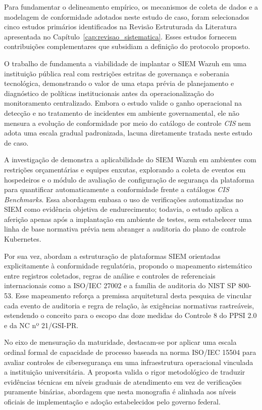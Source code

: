 Para fundamentar o delineamento empírico, os mecanismos de coleta de dados e a modelagem de conformidade adotados neste estudo de caso, foram selecionados cinco estudos primários identificados na Revisão Estruturada da Literatura apresentada no Capítulo~\ref{cap:revisao_sistematica}. Esses estudos fornecem contribuições complementares que subsidiam a definição do protocolo proposto.


O trabalho de  fundamenta a viabilidade de implantar o SIEM Wazuh em uma instituição pública real com restrições estritas de governança e soberania tecnológica, demonstrando o valor de uma etapa prévia de planejamento e diagnóstico de políticas institucionais antes da operacionalização do monitoramento centralizado. Embora o estudo valide o ganho operacional na detecção e no tratamento de incidentes em ambiente governamental, ele não mensura a evolução de conformidade por meio do catálogo de controle \textit{CIS} nem adota uma escala gradual padronizada, lacuna diretamente tratada neste estudo de caso.

A investigação de  demonstra a aplicabilidade do SIEM Wazuh em ambientes com restrições orçamentárias e equipes enxutas, explorando a coleta de eventos em hospedeiros e o módulo de avaliação de configuração de segurança da plataforma para quantificar automaticamente a conformidade frente a catálogos \textit{CIS Benchmarks}. Essa abordagem embasa o uso de verificações automatizadas no SIEM como evidência objetiva de endurecimento; todavia, o estudo aplica a aferição apenas após a implantação em ambiente de testes, sem estabelecer uma linha de base normativa prévia nem abranger a auditoria do plano de controle Kubernetes.

Por sua vez,  abordam a estruturação de plataformas SIEM orientadas explicitamente à conformidade regulatória, propondo o mapeamento sistemático entre registros coletados, regras de análise e controles de referenciais internacionais como a ISO/IEC 27002 e a família de auditoria do NIST SP 800-53. Esse mapeamento reforça a premissa arquitetural desta pesquisa de vincular cada evento de auditoria e regra de relação, às exigências normativas rastreáveis, estendendo o conceito para o escopo das doze medidas do Controle 8 do PPSI 2.0 e da NC nº 21/GSI-PR.

No eixo de mensuração da maturidade,  destacam-se por aplicar uma escala ordinal formal de capacidade de processo baseada na norma ISO/IEC 15504 para avaliar controles de cibersegurança em uma infraestrutura operacional vinculada a instituição universitária. A proposta valida o rigor metodológico de traduzir evidências técnicas em níveis graduais de atendimento em vez de verificações puramente binárias, abordagem que nesta monografia é alinhada aos níveis oficiais de implementação e adoção estabelecidos pelo governo federal.

